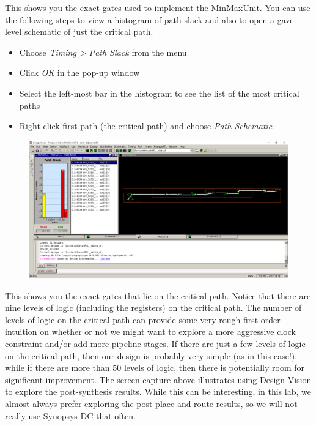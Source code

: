 \documentclass[a4paper,12pt,twoside]{article}
\begin{document}
This shows you the exact gates used to implement the MinMaxUnit. You can use the following steps to view a histogram of path slack and also to open a gave-level schematic of just the critical path.
\begin{itemize}
    \item Choose \textit{Timing > Path Slack} from the menu
    \item Click \textit{OK} in the pop-up window
    \item Select the left-most bar in the histogram to see the list of the most critical paths
    \item Right click first path (the critical path) and choose \textit{Path Schematic}
\end{itemize}
\begin{figure}[H]
    \centering
    \includegraphics[width=\textwidth]{images/10.png}
\end{figure}
This shows you the exact gates that lie on the critical path. Notice that there are nine levels of logic (including the registers) on the critical path. The number of levels of logic on the critical path can provide some very rough first-order intuition on whether or not we might want to explore a more aggressive clock constraint and/or add more pipeline stages. If there are just a few levels of logic on the critical path, then our design is probably very simple (as in this case!), while if there are more than 50 levels of logic, then there is potentially room for significant improvement. The screen capture above illustrates using Design Vision to explore the post-synthesis results. While this can be interesting, in this lab, we almost always prefer exploring the post-place-and-route results, so we will not really use Synopsys DC that often.
\end{document}
